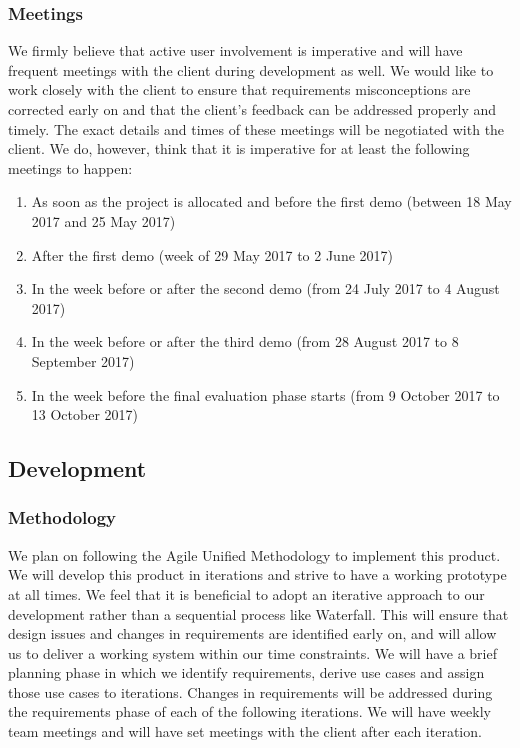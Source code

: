 \documentclass{article}
\begin{document}
        \subsubsection{Meetings}
            We firmly believe that active user involvement is imperative and will have frequent meetings with the client during development as well. We would like to work closely with the client to ensure that requirements misconceptions are corrected early on and that the client's feedback can be addressed properly and timely. The exact details and times of these meetings will be negotiated with the client. We do, however, think that it is imperative for at least the following meetings to happen:
            \begin{enumerate}
                \item As soon as the project is allocated and before the first demo (between 18 May 2017 and 25 May 2017)
                \item After the first demo (week of 29 May 2017 to 2 June 2017)
                \item In the week before or after the second demo (from 24 July 2017 to 4 August 2017)
                \item In the week before or after the third demo (from 28 August 2017 to 8 September 2017)
                \item In the week before the final evaluation phase starts (from 9 October 2017 to 13 October 2017)
            \end{enumerate}
    \subsection{Development}
        \subsubsection{Methodology}
        We plan on following the Agile Unified Methodology to implement this product. We will develop this product in iterations and strive to have a working prototype at all times. We feel that it is beneficial to adopt an iterative approach to our development rather than a sequential process like Waterfall. This will ensure that design issues and changes in requirements are identified early on, and will allow us to deliver a working system within our time constraints. We will have a brief planning phase in which we identify requirements, derive use cases and assign those use cases to iterations. Changes in requirements will be addressed during the requirements phase of each of the following iterations. We will have weekly team meetings and will have set meetings with the client after each iteration.
\end{document}
